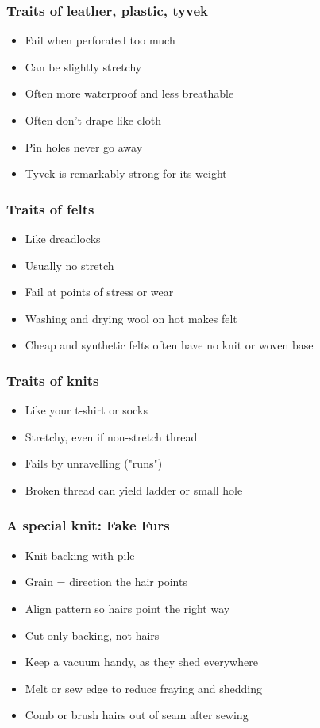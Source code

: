 \documentclass{beamer}
\begin{document}
\begin{frame}[fragile]
\frametitle{Traits of leather, plastic, tyvek}
\begin{itemize}
\item Fail when perforated too much
\item Can be slightly stretchy
\item Often more waterproof and less breathable
\item Often don't drape like cloth
\item Pin holes never go away
\item Tyvek is remarkably strong for its weight
\end{itemize}
\end{frame}

\begin{frame}[fragile]
\frametitle{Traits of felts}
\begin{itemize}
\item Like dreadlocks
\item Usually no stretch
\item Fail at points of stress or wear
\item Washing and drying wool on hot makes felt
\item Cheap and synthetic felts often have no knit or woven base
\end{itemize}
\end{frame}

\begin{frame}[fragile]
\frametitle{Traits of knits}
\begin{itemize}
\item Like your t-shirt or socks
\item Stretchy, even if non-stretch thread
\item Fails by unravelling ("runs")
\item Broken thread can yield ladder or small hole
\end{itemize}
\end{frame}

\begin{frame}[fragile]
\frametitle{A special knit: Fake Furs}
\begin{itemize}
\item Knit backing with pile
\item Grain = direction the hair points
\item Align pattern so hairs point the right way
\item Cut only backing, not hairs
\item Keep a vacuum handy, as they shed everywhere
\item Melt or sew edge to reduce fraying and shedding
\item Comb or brush hairs out of seam after sewing
\end{itemize}
\end{frame}
\end{document}
